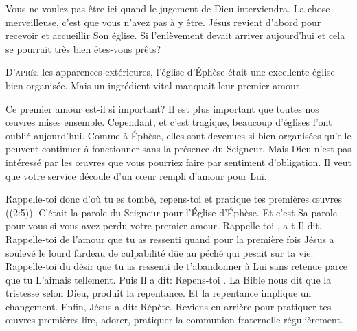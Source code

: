Vous ne voulez pas être ici quand le jugement de Dieu interviendra.
 La chose merveilleuse, c'est que vous n'avez pas à y être.
 Jésus revient d'abord pour recevoir et accueillir Son église. 
 Si l'enlèvement devait arriver aujourd'hui
 \ocadr et cela se pourrait très bien \fcadr{} êtes-vous prêts? 

\dvrule






\lettrine{D}{'après} les apparences extérieures,
 l'église d'Éphèse était une excellente église bien organisée.
 Mais un ingrédient vital manquait \ocadr leur premier amour. 

Ce premier amour est-il si important?
 Il est plus important que toutes nos \oe{}uvres mises ensemble.
 Cependant, et c'est tragique,
 beaucoup d'églises l'ont oublié aujourd'hui.
 Comme à Éphèse, elles sont devenues si bien organisées
 qu'elle peuvent continuer à fonctionner sans la présence du Seigneur.
 Mais Dieu n'est pas intéressé par les \oe{}uvres que vous pourriez faire
 par sentiment d'obligation. Il veut que votre service découle
 d'un c\oe{}ur rempli d'amour pour Lui. 


\Og Rappelle-toi donc d'où tu es tombé, repens-toi
 et pratique tes premières \oe{}uvres \Fg{} ((2:5)).
 C'était la parole du Seigneur pour l'Église d'Éphèse.
 Et c'est Sa parole pour vous si vous avez perdu votre premier amour.
 \Og Rappelle-toi \Fg{},  a-t-Il dit.
 Rappelle-toi de l'amour que tu as ressenti quand pour la première fois
 Jésus a soulevé le lourd fardeau de culpabilité dûe au péché
 qui pesait sur ta vie. Rappelle-toi du désir que tu as ressenti
 de t'abandonner à Lui sans retenue parce que tu L'aimais tellement.
 Puis Il a dit:  \Og Repens-toi \Fg{}.
 La Bible nous dit que la tristesse selon Dieu, produit la repentance.
 Et la repentance implique un changement. Enfin, Jésus a dit: 
 \Og Répète. \Fg{} Reviens en arrière pour pratiquer tes \oe{}uvres premières
 \ocadr lire, adorer, pratiquer la communion fraternelle régulièrement. 

